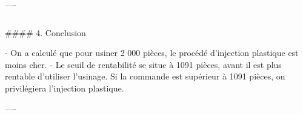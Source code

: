 \documentclass{beamer}
\begin{document}
\begin{frame}[fragile]
\begin{columns}[T]
\begin{column}{.46\textwidth}
\begin{markdown}
----


\end{markdown}
\end{column}
\end{columns}


\bigskip
{\hrulefill}
\bigskip

\begin{markdown}

#### 4. Conclusion

- On a calculé que pour usiner 2 000 pièces, le procédé d'injection plastique est moins cher. 
- Le seuil de rentabilité se situe à 1091 pièces, avant il est plus rentable d'utiliser l'usinage. Si la commande est supérieur à 1091 pièces, on privilégiera l'injection plastique.

----

\end{markdown}

\end{frame}
\end{document}
